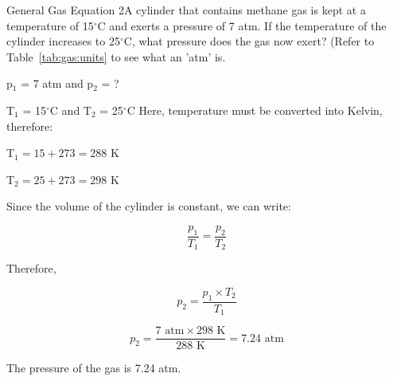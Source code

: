 \begin{wex}{General Gas Equation 2}{A cylinder that contains methane gas is kept at a temperature of 15$^{\circ}$C and exerts a pressure of 7 atm. If the temperature of the cylinder increases to 25$^{\circ}$C, what pressure does the gas now exert? (Refer to Table~\ref{tab:gas:units} to see what an 'atm' is.}{

p$_{1}$ = 7 atm and p$_{2}$ = ?

T$_{1}$ = 15$^{\circ}$C and T$_{2}$ = 25$^{\circ}$C
Here, temperature must be converted into Kelvin, therefore:

T$_{1} = 15 + 273 = 288$ K

T$_{2} = 25 + 273 = 298$ K

Since the volume of the cylinder is constant, we can write:

\begin{equation*}
\frac{p_{1}}{T_{1}} = \frac{p_{2}}{T_{2}}
\end{equation*}

Therefore,

\begin{equation*}
p_{2} = \frac{p_{1} \times T_{2}}{T_{1}}
\end{equation*}

\begin{equation*}
p_{2} = \frac{7 \text{ atm} \times 298 \text{ K}}{288 \text{ K}} = 7.24 \text{ atm}
\end{equation*}

The pressure of the gas is 7.24 atm.
}
\end{wex}


